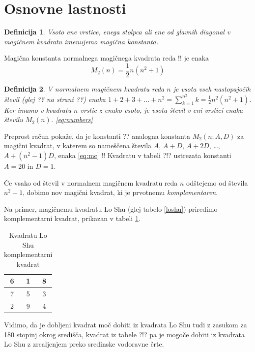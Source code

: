 \documentclass[a4paper,12pt]{article}
\newtheorem{definition}{Definicija}
\begin{document}
\section{Osnovne lastnosti}

  \begin{definition}
      Vsoto ene vrstice, enega stolpca ali ene od glavnih diagonal
      v magičnem kvadratu imenujemo \emph{magična konstanta}.
  \end{definition}

 \begin{theorem}
   Magična konstanta normalnega magičnega kvadrata reda !!
   je enaka
   \begin{equation}
      \label{eq:mc}
      M_2(n) = \frac{1}{2} n(n^2+1)
   \end{equation}
 \end{theorem}
   

\begin{definition}
   V normalnem magičnem kvadratu reda $n$ je vsota vseh nastopajočih
   števil (glej ?? na strani ??) enaka
   $1+2+3+\dots+n^2=\sum_{k=1}^{n^2}k=\frac{1}{2}n^2(n^2+1)$. Ker imamo
   v kvadratu $n$ vrstic z enako vsoto, je vsota števil v eni vrstici
   enaka številu $M_2(n)$. \ref{eq:numbers}
\end{definition}
   

Preprost račun pokaže, da je konstanti ?? analogna konstanta
$M_2(n;A,D)$ za magični kvadrat, v katerem so nameščena števila
$A$, $A+D$, $A+2D$, \dots, $A+(n^2-1)D$, enaka \ref{eq:mc}
!!
Kvadratu v tabeli ?!? ustrezata konstanti $A=20$ in $D=1$.

\begin{defininition}
      Če vsako od števil v normalnem magičnem kvadratu reda $n$ odštejemo
      od števila $n^2+1$, dobimo nov magični kvadrat, ki je prvotnemu
      \emph{komplementaren}.
\end{defininition}

Na primer, magičnemu kvadratu Lo Shu (glej tabelo \ref{loshu}) priredimo
komplementarni kvadrat, prikazan v tabeli \ref{closhu}.
%
\begin{table}[h!]
   \centering
   \caption{Kvadratu Lo Shu komplementarni kvadrat}
   \label{closhu}
   \begin{tabular}{|c|c|c|}
      \hline
      6 & 1 & 8 \\\hline
      7 & 5 & 3 \\\hline
      2 & 9 & 4 \\\hline
   \end{tabular}
\end{table}
Vidimo, da je dobljeni kvadrat moč dobiti iz kvadrata Lo Shu tudi z zasukom za
180 stopinj okrog središča, kvadrat iz tabele ?!? pa je mogoče dobiti
iz kvadrata Lo Shu z zrcaljenjem preko sredinske vodoravne črte.
\end{document}
